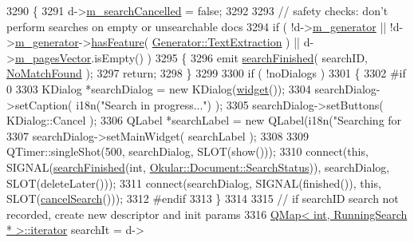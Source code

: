 \begin{DoxyCode}
3290 \{
3291     d->\hyperlink{classOkular_1_1DocumentPrivate_ad852d630ad63f8fd4ce1b2cc93179c91}{m\_searchCancelled} = \textcolor{keyword}{false};
3292 
3293     \textcolor{comment}{// safety checks: don't perform searches on empty or unsearchable docs}
3294     \textcolor{keywordflow}{if} ( !d->\hyperlink{classOkular_1_1DocumentPrivate_a52083f79ce95756ddea060e74315e91f}{m\_generator} || !d->\hyperlink{classOkular_1_1DocumentPrivate_a52083f79ce95756ddea060e74315e91f}{m\_generator}->\hyperlink{classOkular_1_1Generator_aacad530ef4f0c31a4addc89eb85ec8da}{hasFeature}( 
      \hyperlink{classOkular_1_1Generator_a8517096896273a5ba5b970be09313c77a1bf7de5d98ec0333e392ce7f004d6578}{Generator::TextExtraction} ) || d->\hyperlink{classOkular_1_1DocumentPrivate_a73b852d9a73ffe8061b66dbf9b290f17}{m\_pagesVector}.isEmpty() )
3295     \{
3296         emit \hyperlink{classOkular_1_1Document_ae938c994d20bdfef40caa3d37d28d92d}{searchFinished}( searchID, \hyperlink{classOkular_1_1Document_aa9c2934f6abce7b0440ec74bb56eefbba6f1e44c2a23dde543d40770f949a2882}{NoMatchFound} );
3297         \textcolor{keywordflow}{return};
3298     \}
3299 
3300     \textcolor{keywordflow}{if} ( !noDialogs )
3301     \{
3302 \textcolor{preprocessor}{#if 0}
3303         KDialog *searchDialog = \textcolor{keyword}{new} KDialog(\hyperlink{classOkular_1_1Document_aef26598eca4c2fe772cc77d7730a9e8b}{widget}());
3304         searchDialog->setCaption( i18n(\textcolor{stringliteral}{"Search in progress..."}) );
3305         searchDialog->setButtons( KDialog::Cancel );
3306         QLabel *searchLabel = \textcolor{keyword}{new} QLabel(i18n(\textcolor{stringliteral}{"Searching for %
3307         searchDialog->setMainWidget( searchLabel );
3308 
3309         QTimer::singleShot(500, searchDialog, SLOT(show()));
3310         connect(\textcolor{keyword}{this}, SIGNAL(\hyperlink{classOkular_1_1Document_ae938c994d20bdfef40caa3d37d28d92d}{searchFinished}(\textcolor{keywordtype}{int},
      \hyperlink{classOkular_1_1Document_aa9c2934f6abce7b0440ec74bb56eefbb}{Okular::Document::SearchStatus})), searchDialog, SLOT(deleteLater()));
3311         connect(searchDialog, SIGNAL(finished()), \textcolor{keyword}{this}, SLOT(\hyperlink{classOkular_1_1Document_a1f2fa321ed9357c5110b78a0c2502a8d}{cancelSearch}()));
3312 \textcolor{preprocessor}{#endif}
3313     \}
3314 
3315     \textcolor{comment}{// if searchID search not recorded, create new descriptor and init params}
3316     \hyperlink{classQMap}{QMap< int, RunningSearch * >::iterator} searchIt = d->
}
\end{DoxyCode}
